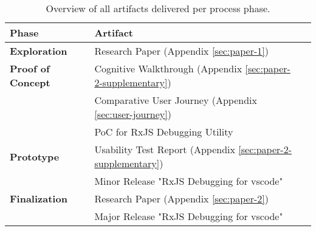 
\begin{table}[h]
  \label{tbl:artifact-overview}
  \caption{Overview of all artifacts delivered per process phase.}

  \newcommand\Tstrut{\rule{0pt}{2.6ex}}       %
  \newcommand\Bstrut{\rule[-0.9ex]{0pt}{0pt}} %
  \newcommand{\TBstrut}{\Tstrut\Bstrut} %

  \begin{tabular}{llp{7.37cm}}
    \textbf{Phase}                              & \textbf{Artifact}                                     \TBstrut \\
    \hline
    \textbf{Exploration}                        & Research Paper (Appendix \ref{sec:paper-1})                                       \TBstrut \\
    \hline
    \textbf{Proof of Concept}  & Cognitive Walkthrough (Appendix \ref{sec:paper-2-supplementary})                                \TBstrut \\
                                               & Comparative User Journey (Appendix \ref{sec:user-journey})                              \Bstrut  \\
                                               & PoC for RxJS Debugging Utility                        \Bstrut \\
    \hline
    \textbf{Prototype}         & Usability Test Report (Appendix \ref{sec:paper-2-supplementary})                               \TBstrut  \\
                                               & Minor Release "RxJS Debugging for vscode" \Bstrut \\
    \hline
    \textbf{Finalization}          & Research Paper (Appendix \ref{sec:paper-2})                                      \TBstrut  \\
                                               & Major Release "RxJS Debugging for vscode" \Bstrut \\
    \hline
  \end{tabular}
\end{table}
